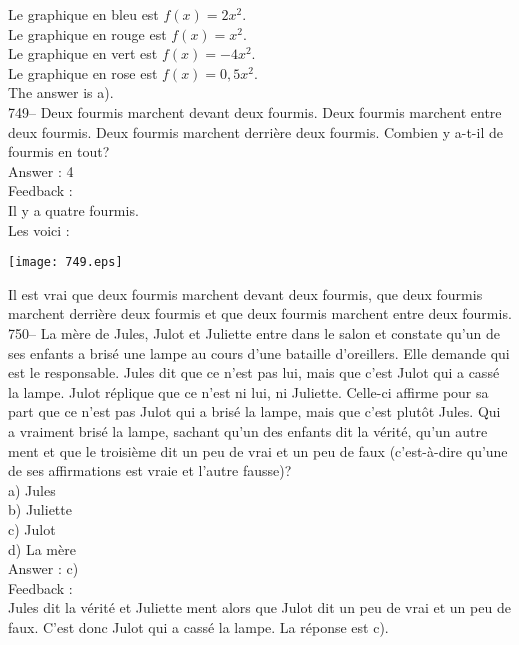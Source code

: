 ﻿\documentclass[letterpaper, 12pt]{article}
\begin{document}
Le graphique en bleu est $f(x)=2x^{2}$.\\
Le graphique en rouge est $f(x)=x^{2}$.\\
Le graphique en vert est $f(x)=-4x^{2}$.\\
Le graphique en rose est $f(x)=0,5x^{2}$.\\
The answer is a).\\


749-- Deux fourmis marchent devant deux fourmis.  Deux fourmis marchent
entre deux fourmis.  Deux fourmis marchent derri\`ere deux fourmis.  Combien
y a-t-il de fourmis en tout?\\


Answer : 4\\

Feedback :\\
Il y a quatre fourmis.\\
Les voici :\\
\begin{center}
\texttt{[image: 749.eps]}
\end{center}

Il est vrai que deux fourmis marchent devant deux fourmis, que deux fourmis
marchent derri\`ere deux fourmis et que deux fourmis marchent entre deux
fourmis. \\

750-- La m\`ere de Jules, Julot et Juliette entre dans le salon et constate
qu'un de ses enfants a bris\'e une lampe au cours d'une bataille
d'oreillers.  Elle demande qui est le responsable. Jules dit que ce n'est
pas lui, mais que c'est Julot qui a cass\'e la lampe.  Julot r\'eplique que
ce n'est ni lui, ni Juliette.  Celle-ci affirme pour sa part que ce n'est
pas Julot qui a bris\'e la lampe, mais que c'est plut\^ot Jules.  Qui a
vraiment bris\'e la lampe, sachant qu'un des enfants dit la v\'erit\'e,
qu'un autre ment et que le troisi\`eme dit un peu de vrai et un peu de faux
(c'est-\`a-dire qu'une de ses affirmations est vraie et l'autre fausse)?\\
a) Jules\\
b) Juliette\\
c) Julot\\
d) La m\`ere\\

Answer : c)\\

Feedback : \\
Jules dit la v\'erit\'e et Juliette ment alors que Julot dit un peu de vrai
et un peu de faux.  C'est donc Julot qui a cass\'e la lampe. La r\'eponse
est c).\\
\end{document}
